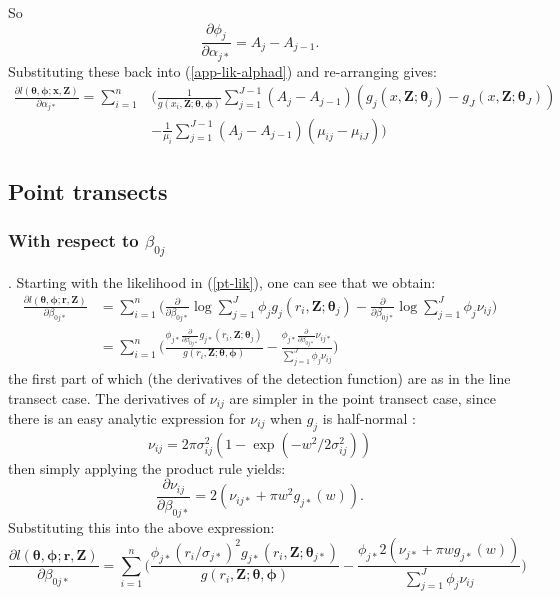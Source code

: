 \documentclass[useAMS,referee, usegraphicx]{biom}
\begin{document}
So
\begin{equation*}
\frac{\partial \phi_j}{\partial \alpha_{j*}} = A_j - A_{j-1}.
\end{equation*}
Substituting these back into (\ref{app-lik-alphad}) and re-arranging gives:
\begin{align*}
\frac{\partial l(\bm{\theta},\bm{\phi}; \mathbf{x},\mathbf{Z})}{\partial \alpha_{j*}} = \sum_{i=1}^n & \Big( \frac{1}{g(x_i,\mathbf{Z}; \bm{\theta},\bm{\phi})} \sum_{j=1}^{J-1} (A_j - A_{j-1}) (g_j(x,\mathbf{Z}; \bm{\theta}_j) - g_J(x,\mathbf{Z}; \bm{\theta}_J))\\
&- \frac{1}{\mu_i} \sum_{j=1}^{J-1}(A_j - A_{j-1})(\mu_{ij} - \mu_{iJ}) \Big)
\end{align*}

\subsection*{Point transects}

\subsubsection*{With respect to $\beta_{0j}$}. Starting with the likelihood in (\ref{pt-lik}), one can see that we obtain:
\begin{align*}
\frac{\partial l(\bm{\theta}, \bm{\phi}; \mathbf{r},\mathbf{Z})}{\partial \beta_{0j*}}  &= \sum_{i=1}^n \Big( \frac{\partial}{\partial \beta_{0j*}} \log \sum_{j=1}^J \phi_j g_j(r_i,\mathbf{Z}; \bm{\theta}_j) - \frac{\partial}{\partial \beta_{0j*}}\log \sum_{j=1}^J \phi_j \nu_{ij}\Big)\\
&= \sum_{i=1}^n \Big( \frac{ \phi_{j*} \frac{\partial}{\partial \beta_{0j*}}  g_{j*} (r_i,\mathbf{Z}; \bm{\theta}_j)}{g(r_i,\mathbf{Z}; \bm{\theta}, \bm{\phi})} - \frac{ \phi_{j*}\frac{\partial}{\partial \beta_{0j*}}  \nu_{ij*} }{ \sum_{j=1}^J \phi_j \nu_{ij}}\Big)
\end{align*}
the first part of which (the derivatives of the detection function) are as in the line transect case. The derivatives of $\nu_{ij}$ are simpler in the point transect case, since there is an easy analytic expression for $\nu_{ij}$ when $g_j$ is half-normal :
\begin{equation*}
\nu_{ij} = 2 \pi \sigma_{ij}^2 (1-\exp (-w^2/2\sigma_{ij}^2 ))
\end{equation*}
then simply applying the product rule yields:
\begin{equation*}
\frac{\partial \nu_{ij}}{\partial \beta_{0j*}} = 2 (\nu_{ij*} + \pi w^2 g_{j*}(w)).
\end{equation*}
Substituting this into the above expression:
\begin{equation*}
\frac{\partial l(\bm{\theta}, \bm{\phi}; \mathbf{r},\mathbf{Z})}{\partial \beta_{0j*}}  = \sum_{i=1}^n \Big( \frac{ \phi_{j*} (r_i/\sigma_{j*})^2 g_{j*}(r_i,\mathbf{Z}; \bm{\theta}_{j*})}{g(r_i,\mathbf{Z}; \bm{\theta}, \bm{\phi})} - \frac{ \phi_{j*} 2 (\nu_{j*} + \pi w g_{j*}(w)) }{ \sum_{j=1}^J \phi_j \nu_{ij}}\Big)
\end{equation*}
\end{document}
